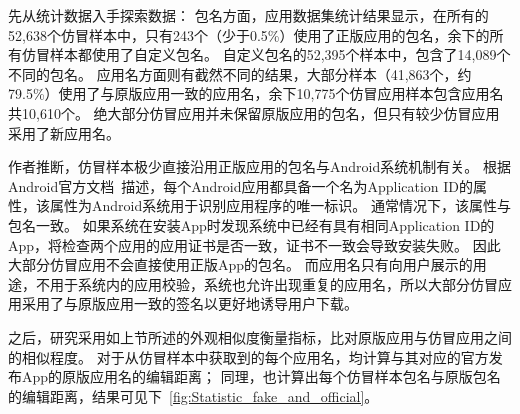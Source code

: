
先从统计数据入手探索数据：
包名方面，应用数据集统计结果显示，在所有的52,638个仿冒样本中，只有243个（少于0.5\%）使用了正版应用的包名，余下的所有仿冒样本都使用了自定义包名。
自定义包名的52,395个样本中，包含了14,089个不同的包名。
应用名方面则有截然不同的结果，大部分样本（41,863个，约79.5\%）使用了与原版应用一致的应用名，余下10,775个仿冒应用样本包含应用名共10,610个。
绝大部分仿冒应用并未保留原版应用的包名，但只有较少仿冒应用采用了新应用名。

作者推断，仿冒样本极少直接沿用正版应用的包名与Android系统机制有关。
根据Android官方文档~\cite{setAppId}描述，每个Android应用都具备一个名为Application ID的属性，该属性为Android系统用于识别应用程序的唯一标识。
通常情况下，该属性与包名一致。
如果系统在安装App时发现系统中已经有具有相同Application ID的App，将检查两个应用的应用证书是否一致，证书不一致会导致安装失败。
因此大部分仿冒应用不会直接使用正版App的包名。
而应用名只有向用户展示的用途，不用于系统内的应用校验，系统也允许出现重复的应用名，所以大部分仿冒应用采用了与原版应用一致的签名以更好地诱导用户下载。

之后，研究采用如上节所述的外观相似度衡量指标，比对原版应用与仿冒应用之间的相似程度。
对于从仿冒样本中获取到的每个应用名，均计算与其对应的官方发布App的原版应用名的编辑距离；
同理，也计算出每个仿冒样本包名与原版包名的编辑距离，结果可见下~\autoref{fig:Statistic_fake_and_official}。

